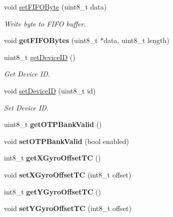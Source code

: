 \begin{DoxyCompactItemize}
void \mbox{\hyperlink{classMPU6050_a66da5bc38aa82404117d1ef5306c951a}{set\+F\+I\+F\+O\+Byte}} (uint8\+\_\+t data)
\begin{DoxyCompactList}\small\item\em Write byte to F\+I\+FO buffer. \end{DoxyCompactList}\item 
\mbox{\label{classMPU6050_aba36dcb767b5cd8965053987aaa08a6a}} 
void {\bfseries get\+F\+I\+F\+O\+Bytes} (uint8\+\_\+t $\ast$data, uint8\+\_\+t length)
\item 
uint8\+\_\+t \mbox{\hyperlink{classMPU6050_a35ae3c8894b3258e642043886801e031}{get\+Device\+ID}} ()
\begin{DoxyCompactList}\small\item\em Get Device ID. \end{DoxyCompactList}\item 
void \mbox{\hyperlink{classMPU6050_aaefb4b3d93cf4b78d56cd63b10ea0e97}{set\+Device\+ID}} (uint8\+\_\+t id)
\begin{DoxyCompactList}\small\item\em Set Device ID. \end{DoxyCompactList}\item 
\mbox{\label{classMPU6050_a6eb099e3dc96eb4d113cf81804256e8c}} 
uint8\+\_\+t {\bfseries get\+O\+T\+P\+Bank\+Valid} ()
\item 
\mbox{\label{classMPU6050_a074024a7818b2998b3f1c99064bea3a0}} 
void {\bfseries set\+O\+T\+P\+Bank\+Valid} (bool enabled)
\item 
\mbox{\label{classMPU6050_afb6b0de954cc89e161e5ac389102af0c}} 
int8\+\_\+t {\bfseries get\+X\+Gyro\+Offset\+TC} ()
\item 
\mbox{\label{classMPU6050_a571bb0b54080a1def63fb4166b7f7f59}} 
void {\bfseries set\+X\+Gyro\+Offset\+TC} (int8\+\_\+t offset)
\item 
\mbox{\label{classMPU6050_aeec244d6f9d33f45260ff459fabb9622}} 
int8\+\_\+t {\bfseries get\+Y\+Gyro\+Offset\+TC} ()
\item 
\mbox{\label{classMPU6050_a5a671929be9a7d6ff5e433aa0eaa0c90}} 
void {\bfseries set\+Y\+Gyro\+Offset\+TC} (int8\+\_\+t offset)

\end{DoxyCompactItemize}
